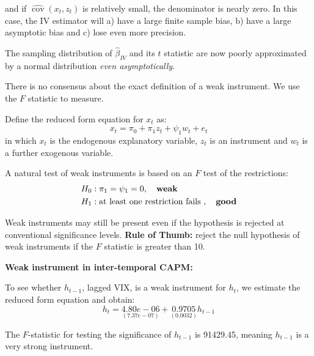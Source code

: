 \documentclass[11pt]{article}
\begin{document}
and if $\widehat{\operatorname{cov}}\left(x_t, z_t\right)$ is relatively small, the denominator is nearly zero. In this case, the IV estimator will a) have a large finite sample bias, b) have a large asymptotic bias and c) lose even more precision.

\begin{note}
    The sampling distribution of $\hat{\beta}_{IV}$ and its $t$ statistic are now poorly approximated by a normal distribution \textit{even asymptotically}.
\end{note}


There is no consensus about the exact definition of a weak instrument. We use the $F$ statistic to measure.

\begin{procedure}
Define the reduced form equation for $x_t$ as:
    \begin{equation}
        \label{test for weak instruments}
        x_t = \pi_0 + \pi_1 z_t + \psi_1 w_t + e_t
    \end{equation}
    in which $x_t$ is the endogenous explanatory variable, $z_t$ is an instrument and $w_t$ is a further exogenous variable.

    A natural test of weak instruments is based on an $F$ test of the restrictions:
    \begin{align*}
        H_0&: \pi_1 = \psi_1 = 0, \quad \text{\textbf{weak}} \\
        H_1&: \text{at least one restriction fails }, \quad \text{\textbf{good}}
    \end{align*}

    Weak instruments may still be present even if the hypothesis is rejected at conventional significance levels. \textbf{Rule of Thumb:} reject the null hypothesis of weak instruments if the $F$ statistic is greater than 10.
\end{procedure}

    \begin{example}
        \textbf{Weak instrument in inter-temporal CAPM:}

        To see whether $h_{t-1}$, lagged VIX, is a weak instrument for $h_t$, we estimate the reduced form equation and obtain:
        \begin{equation}
h_t=\underset{(7.37 e-07)}{4.80 e-06}+\underset{(0.0032)}{0.9705} h_{t-1}
\end{equation}

The $F$-statistic for testing the significance of $h_{t-1}$ is 91429.45, meaning $h_{t-1}$ is a very strong instrument.
    \end{example}
\end{document}
